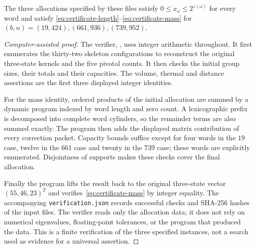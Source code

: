 \begin{lemma}\label{lem:integer-certificates}
The three allocations specified by these files satisfy
$0\le x_\omega\le2^{z(\omega)}$ for every word and satisfy
\eqref{eq:certificate-length}--\eqref{eq:certificate-mass} for
$(b,n)=(19,424),(661,936),(739,952)$.
\end{lemma}
\begin{proof}[Computer-assisted proof]
The verifier, , uses integer arithmetic throughout. It first enumerates the thirty-two skeleton configurations to reconstruct the original three-state kernels and the five pivotal counts. It then checks the initial group sizes, their totals and their capacities. The volume, thermal and distance assertions are the first three displayed integer identities.

For the mass identity, ordered products of the initial allocation are summed by a dynamic program indexed by word length and zero count. A lexicographic prefix is decomposed into complete word cylinders, so the remainder terms are also summed exactly. The program then adds the displayed matrix contribution of every correction packet. Capacity bounds suffice except for four words in the $19$ case, twelve in the $661$ case and twenty in the $739$ case; these words are explicitly enumerated. Disjointness of supports makes these checks cover the final allocation.

Finally the program lifts the result back to the original three-state vector $(55,46,23)^T$ and verifies~\eqref{eq:certificate-mass} by integer equality. The accompanying \texttt{verification.json} records successful checks and SHA-256 hashes of the input files. The verifier reads only the allocation data; it does not rely on numerical eigenvalues, floating-point tolerances, or the program that produced the data. This is a finite verification of the three specified instances, not a search used as evidence for a universal assertion.
\end{proof}

